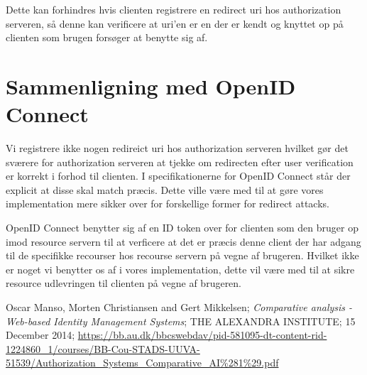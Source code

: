 \documentclass[a4paper,12pt]{article}
\theoremstyle{plain}
\theoremstyle{nonumberplain}
\begin{document}
 Dette kan forhindres hvis clienten registrere en redirect uri hos authorization serveren, så denne kan verificere at uri'en er en der er kendt og knyttet op på clienten som brugen forsøger at benytte sig af.


\section*{Sammenligning med OpenID Connect}
Vi registrere ikke nogen redireict uri hos authorization serveren hvilket gør det sværere for authorization serveren at tjekke om redirecten efter user verification er korrekt i forhod til clienten. I specifikationerne for OpenID Connect står der explicit at disse skal match præcis.
Dette ville være med til at gøre vores implementation mere sikker over for forskellige former for redirect attacks.

OpenID Connect benytter sig af en ID token over for clienten som den bruger op imod resource servern til at verficere at det er præcis denne client der har adgang til de specifikke recourser hos recourse servern på vegne af brugeren.
Hvilket ikke er noget vi benytter os af i vores implementation, dette vil være med til at sikre resource udlevringen til clienten på vegne af brugeren.


\begin{thebibliography}{9}

    Oscar Manso, Morten Christiansen and Gert Mikkelsen;
    \emph{Comparative analysis - Web-based Identity Management Systems};
    THE ALEXANDRA INSTITUTE;
    15 December 2014;
    \url{https://bb.au.dk/bbcswebdav/pid-581095-dt-content-rid-1224860_1/courses/BB-Cou-STADS-UUVA-51539/Authorization_Systems_Comparative_AI%281%29.pdf}

\end{thebibliography}
\end{document}
